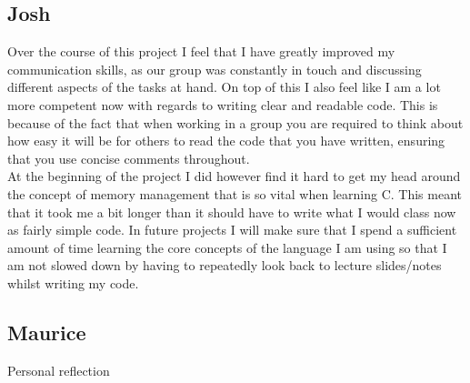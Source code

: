 \documentclass[11pt]{article}
\begin{document}
\subsection{Josh}
Over the course of this project I feel that I have greatly improved my communication skills, as our group was constantly in touch and discussing different aspects of the tasks at hand. On top of this I also feel like I am a lot more competent now with regards to writing clear and readable code. This is because of the fact that when working in a group you are required to think about how easy it will be for others to read the code that you have written, ensuring that you use concise comments throughout. \\

At the beginning of the project I did however find it hard to get my head around the concept of memory management that is so vital when learning C. This meant that it took me a bit longer than it should have to write what I would class now as fairly simple code. In future projects I will make sure that I spend a sufficient amount of time learning the core concepts of the language I am using so that I am not slowed down by having to repeatedly look back to lecture slides/notes whilst writing my code.

\subsection{Maurice}
Personal reflection
\end{document}
